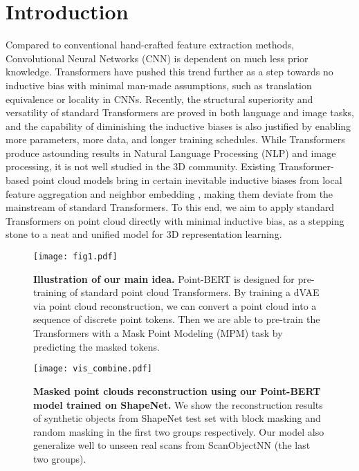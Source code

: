 	\section{Introduction}	\label{sec:intro}
  Compared to conventional hand-crafted feature extraction methods, Convolutional Neural Networks (CNN)\cite{CNN} is dependent on much less prior knowledge. Transformers\cite{vaswani2017attention} have pushed this trend further as a step towards no inductive bias with minimal man-made assumptions, such as translation equivalence or locality in CNNs. Recently, the structural superiority and versatility of standard Transformers are proved in both language \cite{bert,brown2020language,radford2019language,joshi2020spanbert,liu2019roberta} and image tasks\cite{vit,zhu2020deformable,touvron2021training,xie2021self,chen2020generative,beit}, and the capability of diminishing the inductive biases is also justified by enabling more parameters, more data\cite{vit}, and longer training schedules. While Transformers produce astounding results in Natural Language Processing (NLP) and image processing, it is not well studied in the 3D community. Existing Transformer-based point cloud models\cite{zhao2021point,guo2021pct} bring in certain inevitable inductive biases from local feature aggregation\cite{zhao2021point} and neighbor embedding \cite{guo2021pct}, making them deviate from the mainstream of standard Transformers. To this end, we aim to apply standard Transformers on point cloud directly with minimal inductive bias, as a stepping stone to a neat and unified model for 3D representation learning. 
  
\begin{figure}[t]
\centering \texttt{[image: fig1.pdf]}
\caption{\small \textbf{Illustration of our main idea.}  Point-BERT is designed for pre-training of standard point cloud Transformers. By training a dVAE via point cloud reconstruction, we can convert a point cloud into a sequence of discrete point tokens. Then we are able to pre-train the Transformers with a Mask Point Modeling (MPM) task by predicting the masked tokens. 
}
\vspace{-10pt}
\label{fig:insigt} 
\end{figure}

\begin{figure*}[t]
\centering
\texttt{[image: vis\_combine.pdf]}
\caption{\small \textbf{Masked point clouds reconstruction using our Point-BERT model trained on ShapeNet.} 
We show the reconstruction results of synthetic objects from ShapeNet test set with block masking and random masking in the first two groups respectively. Our model also generalize well to unseen real scans from ScanObjectNN (the last two groups). } 
\vspace{-7pt}
\label{fig:vis} 
\end{figure*}
		
